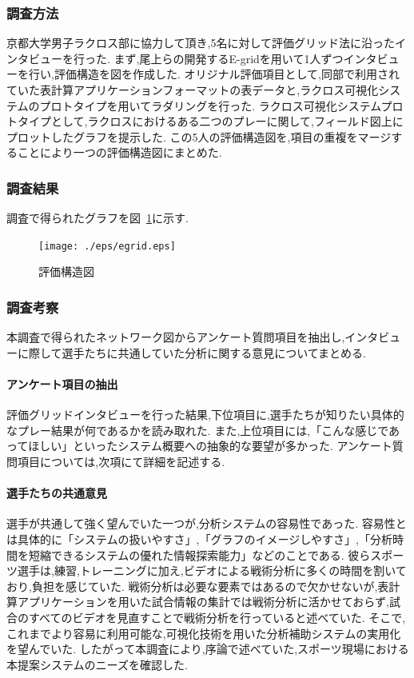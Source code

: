 \documentclass[sotsuron]{kuee}
\begin{document}
			\subsubsection{調査方法}
				京都大学男子ラクロス部に協力して頂き,5名に対して評価グリッド法に沿ったインタビューを行った.
				まず,尾上らの開発するE-gridを用いて1人ずつインタビューを行い,評価構造を図を作成した.
				オリジナル評価項目として,同部で利用されていた表計算アプリケーションフォーマットの表データと,ラクロス可視化システムのプロトタイプを用いてラダリングを行った.
				ラクロス可視化システムプロトタイプとして,ラクロスにおけるある二つのプレーに関して,フィールド図上にプロットしたグラフを提示した.
				この5人の評価構造図を,項目の重複をマージすることにより一つの評価構造図にまとめた.
			\subsubsection{調査結果}	
				調査で得られたグラフを図~\ref{fig:egrid}に示す.
					\begin{figure}
						\begin{center}
							\texttt{[image: ./eps/egrid.eps]}
						\end{center}
						\caption{評価構造図}
				  		\label{fig:egrid}
					\end{figure}
			\subsubsection{調査考察}
				本調査で得られたネットワーク図からアンケート質問項目を抽出し,インタビューに際して選手たちに共通していた分析に関する意見についてまとめる.
				\paragraph{アンケート項目の抽出}
					評価グリッドインタビューを行った結果,下位項目に,選手たちが知りたい具体的なプレー結果が何であるかを読み取れた.
					また,上位項目には,「こんな感じであってほしい」といったシステム概要への抽象的な要望が多かった.
					アンケート質問項目については,次項にて詳細を記述する.
				\paragraph{選手たちの共通意見}
					選手が共通して強く望んでいた一つが,分析システムの容易性であった.
					容易性とは具体的に「システムの扱いやすさ」,「グラフのイメージしやすさ」,「分析時間を短縮できるシステムの優れた情報探索能力」などのことである.
					彼らスポーツ選手は,練習,トレーニングに加え,ビデオによる戦術分析に多くの時間を割いており,負担を感じていた.
					戦術分析は必要な要素ではあるので欠かせないが,表計算アプリケーションを用いた試合情報の集計では戦術分析に活かせておらず,試合のすべてのビデオを見直すことで戦術分析を行っていると述べていた.
					そこで,これまでより容易に利用可能な,可視化技術を用いた分析補助システムの実用化を望んでいた.
					したがって本調査により,序論で述べていた,スポーツ現場における本提案システムのニーズを確認した.
\end{document}
